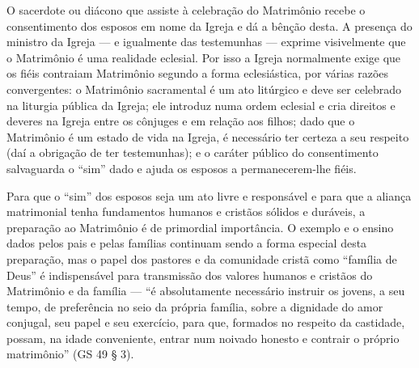 O sacerdote ou diácono que assiste à celebração do Matrimônio recebe o consentimento dos esposos em nome da Igreja e dá a bênção desta. A presença do ministro da Igreja --- e igualmente das testemunhas --- exprime visivelmente que o Matrimônio é uma realidade eclesial. Por isso a Igreja normalmente exige que os fiéis contraiam Matrimônio segundo a forma eclesiástica, por várias razões convergentes: o Matrimônio sacramental é um ato litúrgico e deve ser celebrado na liturgia pública da Igreja; ele introduz numa ordem eclesial e cria direitos e deveres na Igreja entre os cônjuges e em relação aos filhos; dado que o Matrimônio é um estado de vida na Igreja, é necessário ter certeza a seu respeito (daí a obrigação de ter testemunhas); e o caráter público do consentimento salvaguarda o ``sim'' dado e ajuda os esposos a permanecerem-lhe fiéis.

Para que o ``sim'' dos esposos seja um ato livre e responsável e para que a aliança matrimonial tenha fundamentos humanos e cristãos sólidos e duráveis, a preparação ao Matrimônio é de primordial importância. O exemplo e o ensino dados pelos pais e pelas famílias continuam sendo a forma especial desta preparação, mas o papel dos pastores e da comunidade cristã como ``família de Deus'' é indispensável para transmissão dos valores humanos e cristãos do Matrimônio e da família --- ``é absolutamente necessário instruir os jovens, a seu tempo, de preferência no seio da própria família, sobre a dignidade do amor conjugal, seu papel e seu exercício, para que, formados no respeito da castidade, possam, na idade conveniente, entrar num noivado honesto e contrair o próprio matrimônio'' (GS 49 § 3).

